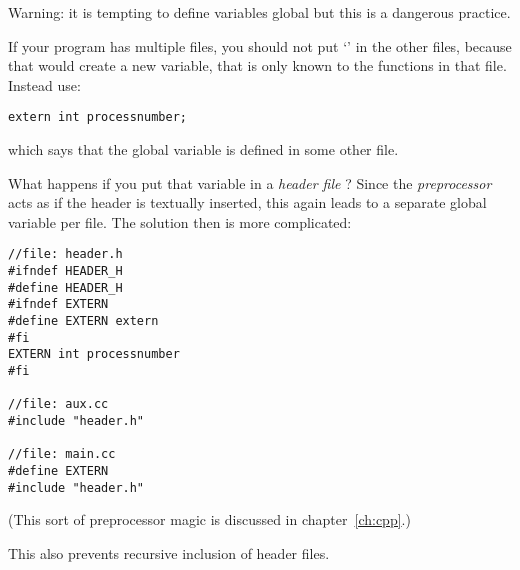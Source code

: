 Warning: it is tempting to define variables global but this is a
dangerous practice.

If your program has multiple files, you should not put `'
in the other files, because that would create a new variable, that is
only known to the functions in that file. Instead use:
\begin{lstlisting}
extern int processnumber;
\end{lstlisting}
which says that the global variable  is defined in
some other file.

What happens if you put that variable in a
%
\emph{header file}%
%
? Since the
%
\emph{preprocessor}%
acts as if the header is textually inserted, this again leads to
a separate global variable per file. The solution then is more
complicated:
\begin{lstlisting}
//file: header.h
#ifndef HEADER_H
#define HEADER_H
#ifndef EXTERN
#define EXTERN extern
#fi
EXTERN int processnumber
#fi

//file: aux.cc
#include "header.h"

//file: main.cc
#define EXTERN
#include "header.h"
\end{lstlisting}
(This sort of preprocessor magic is discussed in chapter~\ref{ch:cpp}.)

This also prevents recursive inclusion of header files.

